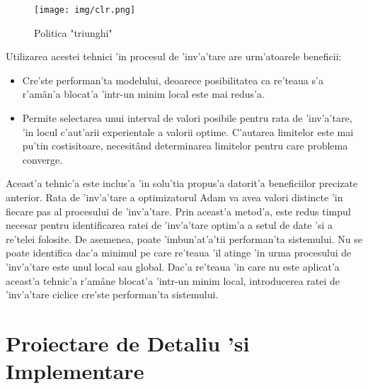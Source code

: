 \documentclass[12pt,a4paper,twoside]{report}
\begin{document}
\begin{figure}[H]
  \texttt{[image: img/clr.png]}
  \centering
  \caption{Politica "triunghi" \protect \footnotemark}
  \label{fig:clr}
\end{figure}

Utilizarea acestei tehnici 'in procesul de 'inv'a'tare are urm'atoarele beneficii:
\begin{itemize}
\item Cre'ste performan'ta modelului, deoarece posibilitatea ca re'teaua s'a r'am\^an'a blocat'a 'intr-un minim local este mai redus'a.
\item Permite selectarea unui interval de valori posibile pentru rata de 'inv'a'tare, 'in locul c'aut'arii experientale a valorii optime. C'autarea limitelor este mai pu'tin costisitoare, necesit\^and determinarea limitelor pentru care problema converge.
\end{itemize}

Aceast'a tehnic'a este inclus'a 'in solu'tia propus'a datorit'a beneficiilor precizate anterior. Rata de 'inv'a'tare a optimizatorul Adam va avea valori distincte 'in fiecare pas al procesului de 'inv'a'tare. Prin aceast'a metod'a, este redus timpul necesar pentru identificarea ratei de 'inv'a'tare optim'a a setul de date 'si a re'telei folosite. De asemenea, poate 'imbun'at'a'tii performan'ta sistemului. Nu se poate identifica dac'a minimul pe care re'teaua 'il atinge 'in urma procesului de 'inv'a'tare este unul local sau global. Dac'a re'teaua 'in care nu este aplicat'a aceast'a tehnic'a r'am\^ane blocat'a 'intr-un minim local, introducerea ratei de 'inv'a'tare ciclice cre'ste performan'ta sistemului. 

\chapter{Proiectare de Detaliu 'si Implementare}
\end{document}

